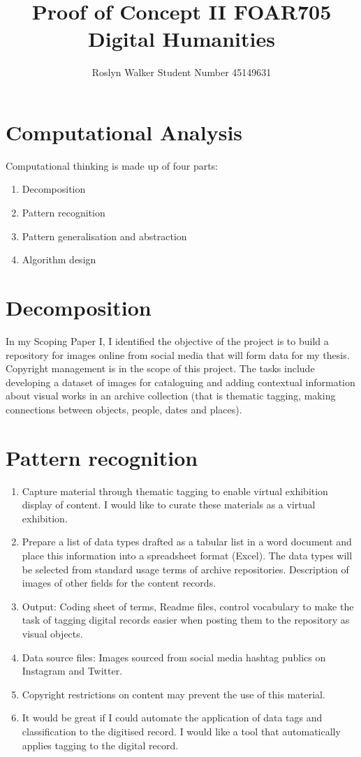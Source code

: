 \documentclass[fleqn,10pt]{olplainarticle}
\title{Proof of Concept II 
FOAR705 Digital Humanities}
\author{Roslyn Walker Student Number 45149631}
\begin{document}
\flushbottom
\maketitle

\section*{Computational Analysis}

Computational thinking is made up of four parts: 
\begin{enumerate}
\item Decomposition
\item Pattern recognition
\item Pattern generalisation and abstraction
\item Algorithm design

\end{enumerate}

\section{Decomposition}
In my Scoping Paper I, I identified the objective of the project is to build a repository for images online from social media that will form data for my thesis. Copyright management is in the scope of this project. The tasks include developing a dataset of images for cataloguing and adding contextual information about visual works in an archive collection (that is thematic tagging, making connections between objects, people, dates and places).

\section{Pattern recognition}
\begin{enumerate}
\item Capture material through thematic tagging to enable virtual exhibition display of content. I would like to curate these materials as a virtual exhibition.
\item Prepare a list of data types drafted as a tabular list in a word document and place this information into a spreadsheet format (Excel). The data types will be selected from standard usage terms of archive repositories. Description of images of other fields for the content records.
\item Output: Coding sheet of terms, Readme files, control vocabulary to make the task of tagging digital records easier when posting them to the repository as visual objects.
\item Data source files: Images sourced from social media hashtag publics on Instagram and Twitter.
\item Copyright restrictions on content may prevent the use of this material.
\item It would be great if I could automate the application of data tags and classification to the digitised record. I would like a tool that automatically applies tagging to the digital record.
\end{enumerate}
\end{document}

